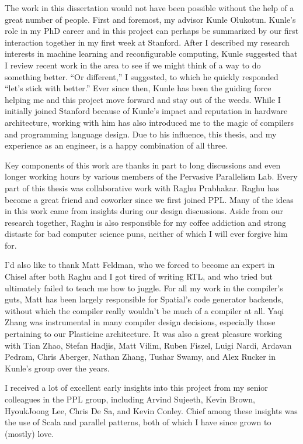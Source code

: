 The work in this dissertation would not have been possible without the help of
a great number of people. First and foremost, my advisor Kunle Olukotun.
Kunle's role in my PhD career and in this project can perhaps be summarized by
our first interaction together in my first week at Stanford.
After I described my research interests in
machine learning and reconfigurable computing, Kunle suggested that I review recent
work in the area to see if we might think of a way to do something better.
``Or different,'' I suggested, to which he quickly responded ``let's stick
with better.''  Ever since then, Kunle has been the guiding force helping me and this
project move forward and stay out of the weeds. While I initially joined Stanford
because of Kunle's impact and reputation in hardware architecture, working with him
has also introduced me to the magic of compilers and programming language design.
Due to his influence, this thesis, and my experience as an engineer, is a
happy combination of all three.

Key components of this work are thanks in part to long discussions and even longer
working hours by various members of the Pervasive Parallelism Lab.
Every part of this thesis was collaborative work with Raghu Prabhakar.
Raghu has become a great friend and coworker since we first joined PPL. Many of
the ideas in this work came from insights during our design discussions.
Aside from our research together, Raghu is also responsible for my
coffee addiction and strong distaste for bad computer science puns, neither of
which I will ever forgive him for.

I'd also like to thank Matt Feldman, who we forced to become an expert in Chisel
after both Raghu and I got tired of writing RTL,
and who tried but ultimately failed to teach me how to juggle.
For all my work in the compiler's guts, Matt has been largely
responsible for Spatial's code generator backends, without which the
compiler really wouldn't be much of a compiler at all.
Yaqi Zhang was instrumental in many compiler design decisions, especially those
pertaining to our Plasticine architecture.
It was also a great pleasure working with Tian Zhao, Stefan Hadjis, Matt Vilim,
Ruben Fiszel, Luigi Nardi, Ardavan Pedram, Chris Aberger, Nathan Zhang,
Tushar Swamy, and Alex Rucker in Kunle's group over the years.

I received a lot of excellent early insights into this project from my senior
colleagues in the PPL group, including Arvind Sujeeth, Kevin Brown, HyoukJoong
Lee, Chris De Sa, and Kevin Conley. Chief among these insights was the use of
Scala and parallel patterns, both of which I have since grown to (mostly) love.

